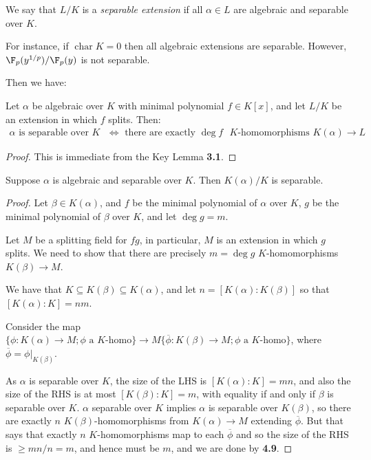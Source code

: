 \documentclass[a4paper, 10pt, twocolumn]{amsart}
\renewcommand{\charr}{\operatorname{char}}
\begin{document}
We say that $L/K$ is a \emph{separable extension} if all $\alpha \in L$ are algebraic and separable over $K$.

For instance, if $\charr K = 0$ then all algebraic extensions are separable. However, $\F_p(y^{1/p}) / \F_p(y)$ is not separable.

Then we have:
\begin{lemma}
Let $\alpha$ be algebraic over $K$ with minimal polynomial $f \in K[x]$, and let $L/K$ be an extension in which $f$ splits. Then:
\begin{align*}
\alpha \text{ is separable over $K$ } \iff \text{ there are exactly $\deg f$ $K$-homomorphisms $K(\alpha)\to L$}
\end{align*}
\end{lemma}
\begin{proof}
This is immediate from the Key Lemma \textbf{3.1}.
\end{proof}
\begin{proposition}
Suppose $\alpha$ is algebraic and separable over $K$. Then $K(\alpha)/K$ is separable.
\end{proposition}
\begin{proof}
Let $\beta \in K(\alpha)$, and $f$ be the minimal polynomial of $\alpha$ over $K$, $g$ be the minimal polynomial of $\beta$ over $K$, and let $\deg g = m$.

Let $M$ be a splitting field for $fg$, in particular, $M$ is an extension in which $g$ splits. We need to show that there are precisely $m = \deg g$ $K$-homomorphisms $K(\beta)\to M$.

We have that $K\subseteq K(\beta) \subseteq K(\alpha)$, and let $n = [K(\alpha):K(\beta)]$ so that $[K(\alpha):K] = nm$.

Consider the map $\{\phi : K(\alpha)\to M; \phi \text{ a $K$-homo}\} \to M\{\overline{\phi}:K(\beta)\to M; \phi \text{ a $K$-homo}\}$, where $\overline{\phi} = \phi|_{K(\beta)}$.

As $\alpha$ is separable over $K$, the size of the LHS is $[K(\alpha):K] = mn$, and also the size of the RHS is at most $[K(\beta):K] = m$, with equality if and only if $\beta$ is separable over $K$. $\alpha$ separable over $K$ implies $\alpha$ is separable over $K(\beta)$, so there are exactly $n$ $K(\beta)$-homomorphisms from $K(\alpha)\to M$ extending $\overline{\phi}$. But that says that exactly $n$ $K$-homomorphisms map to each $\overline{\phi}$ and so the size of the RHS is $\geq mn/n = m$, and hence must be $m$, and we are done by \textbf{4.9}.
\end{proof}
\end{document}
